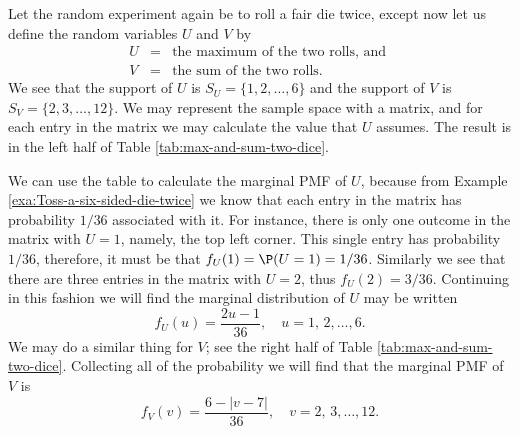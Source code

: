 \documentclass[captions=tableheading]{scrbook}
\begin{document}
\begin{example}
\label{exa:max-sum-two-dice}

Let the random experiment again be to roll a fair die twice, except now let us define the random variables \(U\) and \(V\) by
\begin{eqnarray*}
U & = & \mbox{the maximum of the two rolls, and }\\
V & = & \mbox{the sum of the two rolls.}
\end{eqnarray*}
We see that the support of \(U\) is \(S_{U}= \{ 1,2,\ldots,6 \} \) and the support of \(V\) is \(S_{V}= \{ 2,3,\ldots,12 \} \). We may represent the sample space with a matrix, and for each entry in the matrix we may calculate the value that \(U\) assumes. The result is in the left half of Table \ref{tab:max-and-sum-two-dice}. 

We can use the table to calculate the marginal PMF of \(U\), because from Example \ref{exa:Toss-a-six-sided-die-twice} we know that each entry in the matrix has probability \(1/36\) associated with it. For instance, there is only one outcome in the matrix with \(U=1\), namely, the top left corner. This single entry has probability \(1/36\), therefore, it must be that \(f_{U}(1)=\P(U=1)=1/36\). Similarly we see that there are three entries in the matrix with \(U=2\), thus \(f_{U}(2)=3/36\). Continuing in this fashion we will find the marginal distribution of \(U\) may be written
\begin{equation}
f_{U}(u)=\frac{2u-1}{36},\quad u=1,\,2,\ldots,6.
\end{equation}
We may do a similar thing for \(V\); see the right half of Table \ref{tab:max-and-sum-two-dice}. Collecting all of the probability we will find that the marginal PMF of \(V\) is
\begin{equation}
f_{V}(v)=\frac{6-|v-7|}{36},\quad v=2,\,3,\ldots,12.
\end{equation}


\end{example}
\end{document}
